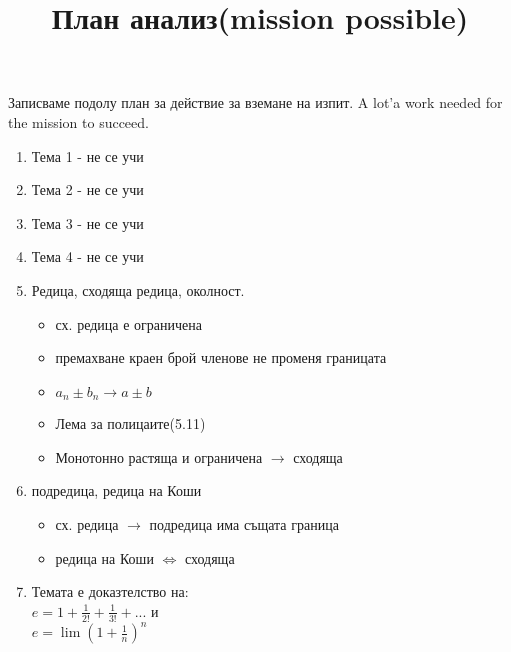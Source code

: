 \documentclass{article}
\date{}
\title{План анализ(mission possible)}
\begin{document}
	
	\maketitle
	Записваме подолу план за действие за вземане на изпит. A lot'a work needed for the mission to succeed.
	\begin{enumerate}
		
		\item  Тема 1 - не се учи
		\item Тема 2 - не се учи
		\item Тема 3 - не се учи
		\item Тема 4 - не се учи
		\item Редица, сходяща редица, околност.
		\begin{itemize}
		\item сх. редица е ограничена
		\item премахване краен брой членове не променя границата
		\item $a_n \pm  b_n \to a\pm b$
		\item Лема за полицаите(5.11)
		\item Монотонно растяща и ограничена $\to $ сходяща
	\end{itemize}
		
		\item подредица, редица на Коши
		\begin{itemize}
			\item сх. редица $\to$ подредица има същата граница
			\item редица на Коши $\iff$ сходяща
	
		\end{itemize}
	\item Темата е доказтелство на:\\
	$e = 1 + \frac{1}{2!} + \frac{1}{3!} + ... $ и \\
	$e = \lim (1+\frac{1}{n})^n $
	

\end{enumerate}
\end{document}
